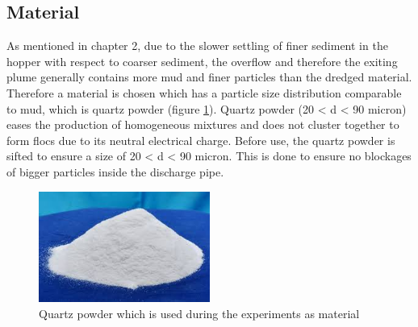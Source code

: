\subsection{Material}
As mentioned in chapter 2, due to the slower settling of finer sediment in the hopper with respect to coarser sediment, the overflow and therefore the exiting plume generally contains more mud and finer particles than the dredged material. Therefore a material is chosen which has a particle size distribution comparable to mud, which is quartz powder (figure \ref{fig:quartz_powder}). Quartz powder (20 < d < 90 micron) eases the production of homogeneous mixtures and does not cluster together to form flocs due to its neutral electrical charge. Before use, the quartz powder is sifted to ensure a size of 20 < d < 90 micron. This is done to ensure no blockages of bigger particles inside the discharge pipe.

\begin{figure}[ht!]
    \centering
    \includegraphics[width=0.5\textwidth]{Images/Quartz_powder.jpg}
    \caption{Quartz powder which is used during the experiments as material}
    \label{fig:quartz_powder}
\end{figure}



